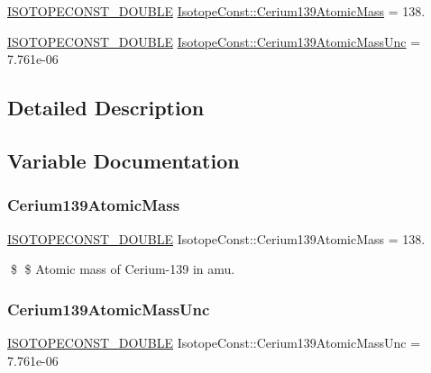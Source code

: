 \begin{DoxyCompactItemize}
\item 
\mbox{\hyperlink{group___isotope_const-_macros_ga8f45a7272ce02c0b4c65c44636ed719a}{I\+S\+O\+T\+O\+P\+E\+C\+O\+N\+S\+T\+\_\+\+D\+O\+U\+B\+LE}} \mbox{\hyperlink{group___isotope_const-_cerium-_ce139_gaadf22c1058dfcb07148e4179062161c6}{Isotope\+Const\+::\+Cerium139\+Atomic\+Mass}} = 138.
\item 
\mbox{\hyperlink{group___isotope_const-_macros_ga8f45a7272ce02c0b4c65c44636ed719a}{I\+S\+O\+T\+O\+P\+E\+C\+O\+N\+S\+T\+\_\+\+D\+O\+U\+B\+LE}} \mbox{\hyperlink{group___isotope_const-_cerium-_ce139_gac3b90d8ed775c799aac40bbfc4f93519}{Isotope\+Const\+::\+Cerium139\+Atomic\+Mass\+Unc}} = 7.\+761e-\/06
\end{DoxyCompactItemize}


\subsection{Detailed Description}


\subsection{Variable Documentation}
\mbox{\label{group___isotope_const-_cerium-_ce139_gaadf22c1058dfcb07148e4179062161c6}} 
\subsubsection{\texorpdfstring{Cerium139\+Atomic\+Mass}{Cerium139AtomicMass}}
{\footnotesize\ttfamily \mbox{\hyperlink{group___isotope_const-_macros_ga8f45a7272ce02c0b4c65c44636ed719a}{I\+S\+O\+T\+O\+P\+E\+C\+O\+N\+S\+T\+\_\+\+D\+O\+U\+B\+LE}} Isotope\+Const\+::\+Cerium139\+Atomic\+Mass = 138.}

\$ \$ Atomic mass of Cerium-\/139 in amu. \mbox{\label{group___isotope_const-_cerium-_ce139_gac3b90d8ed775c799aac40bbfc4f93519}} 
\subsubsection{\texorpdfstring{Cerium139\+Atomic\+Mass\+Unc}{Cerium139AtomicMassUnc}}
{\footnotesize\ttfamily \mbox{\hyperlink{group___isotope_const-_macros_ga8f45a7272ce02c0b4c65c44636ed719a}{I\+S\+O\+T\+O\+P\+E\+C\+O\+N\+S\+T\+\_\+\+D\+O\+U\+B\+LE}} Isotope\+Const\+::\+Cerium139\+Atomic\+Mass\+Unc = 7.\+761e-\/06}

